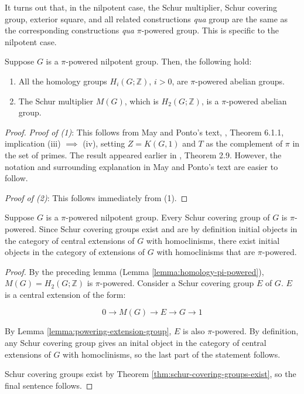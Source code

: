 It turns out that, in the nilpotent case, the Schur multiplier, Schur
covering group, exterior square, and all related constructions {\em
  qua} group are the same as the corresponding constructions {\em qua}
$\pi$-powered group. This is specific to the nilpotent case.

\begin{lemma}\label{lemma:homology-pi-powered}
  Suppose $G$ is a $\pi$-powered nilpotent group. Then, the following
  hold:

  \begin{enumerate}
    \item All the homology groups $H_i(G;\mathbb{Z})$, $i > 0$, are
      $\pi$-powered abelian groups.
    \item The Schur multiplier $M(G)$, which is $H_2(G;\mathbb{Z})$, is
      a $\pi$-powered abelian group.
  \end{enumerate}
\end{lemma}

\begin{proof}
  {\em Proof of (1)}: This follows from May and Ponto's text,
  \cite{ConciseII}, Theorem 6.1.1, implication (iii) $\implies$ (iv),
  setting $Z = K(G,1)$ and $T$ as the complement of $\pi$ in the set
  of primes. The result appeared earlier in
  \cite{HiltonMislinRoitberg}, Theorem 2.9. However, the notation and
  surrounding explanation in May and Ponto's text are easier to
  follow. 

  {\em Proof of (2)}: This follows immediately from (1).
\end{proof}

\begin{lemma}\label{lemma:schur-cover-pi-powered}
  Suppose $G$ is a $\pi$-powered nilpotent group. Every Schur covering
  group of $G$ is $\pi$-powered. Since Schur covering groups exist and
  are by definition initial objects in the category of central
  extensions of $G$ with homoclinisms, there exist initial objects in
  the category of extensions of $G$ with homoclinisms that are
  $\pi$-powered.
\end{lemma}

\begin{proof}
  By the preceding lemma (Lemma \ref{lemma:homology-pi-powered}),
  $M(G) = H_2(G;\mathbb{Z})$ is $\pi$-powered. Consider a Schur
  covering group $E$ of $G$. $E$ is a central extension of the form:

  $$0 \to M(G) \to E \to G \to 1$$

  By Lemma \ref{lemma:powering-extension-group}, $E$ is also
  $\pi$-powered. By definition, any Schur covering group gives an
  inital object in the category of central extensions of $G$ with
  homoclinisms, so the last part of the statement follows.

  Schur covering groups exist by Theorem
  \ref{thm:schur-covering-groups-exist}, so the final sentence
  follows.
\end{proof}

